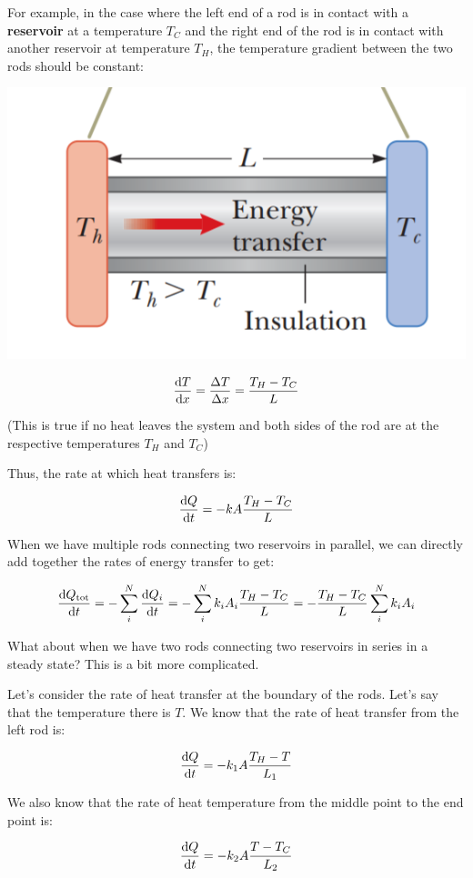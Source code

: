 \documentclass{report}
\begin{document}
For example, in the case where the left end of a rod is in contact with a \textbf{reservoir} at a temperature $T_C$ and the right end of the rod is in contact with another reservoir at temperature $T_H$, the temperature gradient between the two rods should be constant:
\begin{center}
    \includegraphics[scale=0.5]{conduction.PNG}
\end{center}

$$\dv{T}{x} = \frac{\Delta T}{\Delta x} = \frac{T_H-T_C}{L}$$

(This is true if no heat leaves the system and both sides of the rod are at the respective temperatures $T_H$ and $T_C$)

Thus, the rate at which heat transfers is:

$$\dv{Q}{t} = -kA\frac{T_H-T_C}{L}$$

When we have multiple rods connecting two reservoirs in parallel, we can directly add together the rates of energy transfer to get:


$$\dv{Q_{\text{tot}}}{t} = -\sum_i^N\dv{Q_i}{t} = -\sum_i^Nk_iA_i\frac{T_H-T_C}{L} = -\frac{T_H-T_C}{L}\sum_i^N k_iA_i$$

What about when we have two rods connecting two reservoirs in series in a steady state? This is a bit more complicated.

Let's consider the rate of heat transfer at the boundary of the rods. Let's say that the temperature there is $T$. We know that the rate of heat transfer from the left rod is:

$$\dv{Q}{t} = -k_1A\frac{T_H-T}{L_1} $$

We also know that the rate of heat temperature from the middle point to the end point is:

$$\dv{Q}{t} =- k_2A\frac{T-T_C}{L_2}$$
\end{document}
